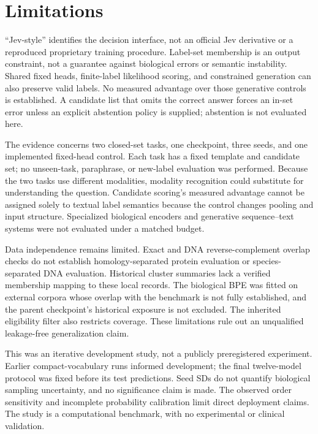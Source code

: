 \section{Limitations}
``Jev-style'' identifies the decision interface, not an official Jev derivative or a reproduced proprietary training procedure. Label-set membership is an output constraint, not a guarantee against biological errors or semantic instability. Shared fixed heads, finite-label likelihood scoring, and constrained generation can also preserve valid labels. No measured advantage over those generative controls is established. A candidate list that omits the correct answer forces an in-set error unless an explicit abstention policy is supplied; abstention is not evaluated here.

The evidence concerns two closed-set tasks, one checkpoint, three seeds, and one implemented fixed-head control. Each task has a fixed template and candidate set; no unseen-task, paraphrase, or new-label evaluation was performed. Because the two tasks use different modalities, modality recognition could substitute for understanding the question. Candidate scoring's measured advantage cannot be assigned solely to textual label semantics because the control changes pooling and input structure. Specialized biological encoders and generative sequence--text systems were not evaluated under a matched budget.

Data independence remains limited. Exact and DNA reverse-complement overlap checks do not establish homology-separated protein evaluation or species-separated DNA evaluation. Historical cluster summaries lack a verified membership mapping to these local records. The biological BPE was fitted on external corpora whose overlap with the benchmark is not fully established, and the parent checkpoint's historical exposure is not excluded. The inherited eligibility filter also restricts coverage. These limitations rule out an unqualified leakage-free generalization claim.

This was an iterative development study, not a publicly preregistered experiment. Earlier compact-vocabulary runs informed development; the final twelve-model protocol was fixed before its test predictions. Seed SDs do not quantify biological sampling uncertainty, and no significance claim is made. The observed order sensitivity and incomplete probability calibration limit direct deployment claims. The study is a computational benchmark, with no experimental or clinical validation.
